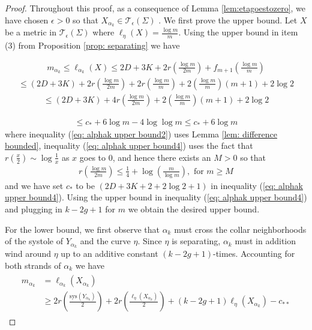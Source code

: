 \documentclass[12pt]{amsart}
\numberwithin{equation}{section}
\theoremstyle{plain}
\begin{document}
\begin{proof}   Throughout this proof, as a consequence of Lemma \ref{lem:etagoestozero}, we have chosen  $\epsilon >0$
so that  $X_{\alpha_k} \in \mathcal{T}_{\epsilon}(\Sigma)$ . 
We first prove the upper bound. 
  Let $X$ be a metric in $\mathcal{T}_{\epsilon}(\Sigma)$ where $\ell_{\eta}(X)=\frac{\log m}{m}$. 
Using the upper bound in item (3) from Proposition \ref{prop: separating} we have

 
\begin{align} \label{eq: alphak upper bound}
m_{\alpha_{k}} \leq  \ell_{\alpha_{k}}(X) 
\leq
2D+ 3K + 2 r\left(\frac{\log m}{2m}\right)+
 f_{m+1}\left(\frac{\log m}{m}\right)
\end{align}
\begin{align}\label{eq: alphak upper bound2}
\leq (2D+3K)+2 r\left(\frac{\log m}{2m}\right)+2r\left(\frac{\log m}{m}\right)+2\left(\frac{\log m}{m}\right)(m+1) +2\log 2
\end{align}
\begin{align}\label{eq: alphak upper bound3}
\leq (2D+3K)+4 r\left(\frac{\log m}{2m}\right)+2\left(\frac{\log m}{m}\right)(m+1) +2\log 2
\end{align}

\begin{align} \label{eq: alphak upper bound4}
\leq  c_* + 6 \log m - 4 \log \log m \leq  c_* + 6 \log m
\end{align}
where inequality (\ref{eq: alphak upper bound2}) uses Lemma \ref{lem: difference bounded}, 
  inequality (\ref{eq: alphak upper bound4})  uses  the fact that $r(\frac{x}{2}) \sim \log \frac{1}{x}$  as $x$ goes  to $0$, and hence there exists an $M >0$ so that  \begin{align}
r\left(\frac{\log m}{2m}\right)\leq  \frac{1}{4}+\log \left(\frac{m}{\log m}\right),
\text{ for } m \geq M
\end{align}
and we have
set $c_{*}$ to be  $(2D+3K+ 2 + 2 \log 2 +1)$  in inequality  (\ref{eq: alphak upper bound4}).
Using the upper bound in inequality (\ref{eq: alphak upper bound4}) and plugging in $k-2g+1$ for $m$ we obtain the desired upper bound. 



For the lower bound,  we first observe that $\alpha_{k}$ must cross the collar neighborhoods of the systole of $Y_{\alpha_k}$ and the curve $\eta$. Since $\eta$ is separating,  $\alpha_{k}$ must in addition   wind  around  
$\eta$  up to an additive constant $(k-2g+1)$-times. Accounting for both strands of $\alpha_{k}$ we have
 \begin{align}\label{eq: better lower bound on alpha}
 \begin{split}
 m_{\alpha_{k}} &= \ell_{\alpha_{k}}(X_{\alpha_k})\\
 &\geq
2r\left(\frac{\text{sys} (Y_{\alpha_k})}{2}\right) +2r\left(\frac{\ell_{\eta}(X_{\alpha_k})}{2}\right)
  + (k-2g+1) \ell_{\eta}(X_{\alpha_k}) -c_{**}
  \end{split}
  \end{align}
  

\end{proof}
\end{document}
